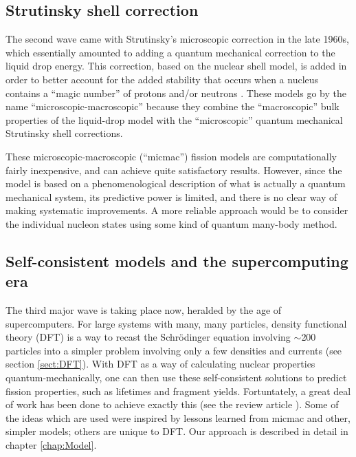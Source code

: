 \subsection{Strutinsky shell correction}
The second wave came with Strutinsky’s microscopic correction in the late 1960s, which essentially amounted to adding a quantum mechanical correction to the liquid drop energy. This correction, based on the nuclear shell model, is added in order to better account for the added stability that occurs when a nucleus contains a ``magic number'' of protons and/or neutrons \cite{Strutinsky1967, Strutinsky1968, Brack1972}. These models go by the name ``microscopic-macroscopic'' because they combine the ``macroscopic'' bulk properties of the liquid-drop model with the ``microscopic'' quantum mechanical Strutinsky shell corrections.

These microscopic-macroscopic (``micmac'') fission models are computationally fairly inexpensive, and can achieve quite satisfactory results. However, since the model is based on a phenomenological description of what is actually a quantum mechanical system, its predictive power is limited, and there is no clear way of making systematic improvements. A more reliable approach would be to consider the individual nucleon states using some kind of quantum many-body method. 

\subsection{Self-consistent models and the supercomputing era}
The third major wave is taking place now, heralded by the age of supercomputers. For large systems with many, many particles, density functional theory (DFT) is a way to recast the Schr\"{o}dinger equation involving $\sim$200 particles into a simpler problem involving only a few densities and currents (see section \ref{sect:DFT}). With DFT as a way of calculating nuclear properties quantum-mechanically, one can then use these self-consistent solutions to predict fission properties, such as lifetimes and fragment yields. Fortuntately, a great deal of work has been done to achieve exactly this (see the review article \cite{Schunck2016}). Some of the ideas which are used were inspired by lessons learned from micmac and other, simpler models; others are unique to DFT. Our approach is described in detail in chapter \ref{chap:Model}.

